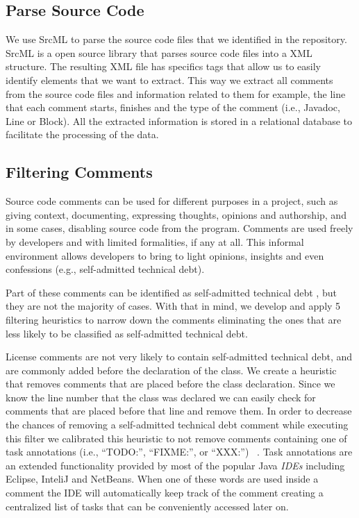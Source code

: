\subsection*{Parse Source Code}
\label{sub:parse_source_code}

We use SrcML \cite{Collard2013SIE} to parse the source code files that we identified in the repository. SrcML is a open source library that parses source code files into a XML structure. The resulting XML file has specifics tags that allow us to easily identify elements that we want to extract. This way we extract all comments from the source code files and information related to them for example, the line that each comment starts, finishes and the type of the comment (i.e., Javadoc, Line or Block). All the extracted information is stored in a relational database to facilitate the processing of the data. 


\subsection*{Filtering Comments}
\label{sub:filtering_comments}

Source code comments can be used for different purposes in a project, such as giving context, documenting, expressing thoughts, opinions and authorship, and in some cases, disabling source code from the program. Comments are used freely by developers and with limited formalities, if any at all. This informal environment allows developers to bring to light opinions, insights and even confessions (e.g., self-admitted technical debt). 

Part of these comments can be identified as self-admitted technical debt \cite{Potdar2014ICSME}, but they are not the majority of cases. With that in mind, we develop and apply 5 filtering heuristics to narrow down the comments eliminating the ones that are less likely to be classified as self-admitted technical debt. 

License comments are not very likely to contain self-admitted technical debt, and are commonly added before the declaration of the class. We create a heuristic that removes comments that are placed before the class declaration. Since we know the line number that the class was declared we can easily check for comments that are placed before that line and remove them. In order to decrease the chances of removing a self-admitted technical debt comment while executing this filter we calibrated this heuristic to not remove comments containing one of task annotations (i.e., ``TODO:'', ``FIXME:'', or ``XXX:'') ~\cite{Storey2008ICSE}. Task annotations are an extended functionality provided by most of the popular Java \textit{IDEs} including Eclipse, InteliJ and NetBeans. When one of these words are used inside a comment the IDE will automatically keep track of the comment creating a centralized list of tasks that can be conveniently accessed later on.

